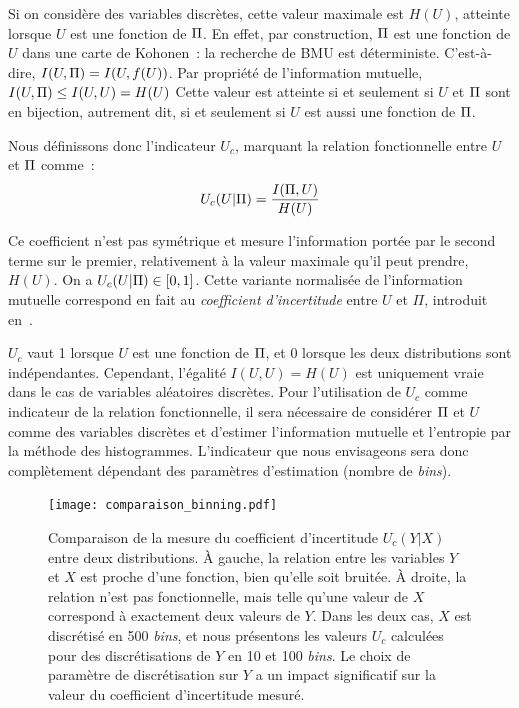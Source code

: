 \documentclass[../main]{subfiles}
\begin{document}
Si on considère des variables discrètes, cette valeur maximale est $H(U)$, atteinte lorsque $U$ est une fonction de $\Pi$.
En effet, par construction, $\Pi$ est une fonction de $U$ dans une carte de Kohonen~: la recherche de BMU est déterministe. C'est-à-dire, $I(U,\Pi) = I (U, f(U))$.
Par propriété de l'information mutuelle, $I(U,\Pi) \leq I(U,U) = H(U)$
Cette valeur est atteinte si et seulement si $U$ et $\Pi$ sont en bijection, autrement dit, si et seulement si $U$ est aussi une fonction de $\Pi$.

Nous définissons donc l'indicateur $U_c$, marquant la relation fonctionnelle entre $U$ et $\Pi$ comme~:
\begin{equation}
U_c(U|\Pi) = \frac{I(\Pi,U)}{H(U)}
\end{equation}

Ce coefficient n'est pas symétrique et mesure l'information portée par le second terme sur le premier, relativement à la valeur maximale qu'il peut prendre, $H(U)$. 
On a $U_c(U|\Pi) \in [0,1]$. 
Cette variante normalisée de l'information mutuelle correspond en fait au \emph{coefficient d'incertitude} entre $U$ et $\Pi$, introduit en~\cite{Theil1961EconomicFA}.

$U_c$ vaut 1 lorsque $U$ est une fonction de $\Pi$, et $0$ lorsque les deux distributions sont indépendantes.
Cependant, l'égalité $I(U,U) = H(U)$ est uniquement vraie dans le cas de variables aléatoires discrètes.
Pour l'utilisation de $U_c$ comme indicateur de la relation fonctionnelle, il sera nécessaire de considérer $\Pi$ et $U$ comme des variables discrètes et d'estimer l'information mutuelle et l'entropie par la méthode des histogrammes. L'indicateur que nous envisageons sera donc complètement dépendant des paramètres d'estimation (nombre de \emph{bins}).

\begin{figure}
    \centering
    \texttt{[image: comparaison\_binning.pdf]}
    \caption{Comparaison de la mesure du coefficient d'incertitude $U_c(Y|X)$ entre deux distributions. À gauche, la relation entre les variables $Y$ et $X$ est proche d'une fonction, bien qu'elle soit bruitée. À droite, la relation n'est pas fonctionnelle, mais telle qu'une valeur de $X$ correspond à exactement deux valeurs de $Y$. Dans les deux cas, $X$ est discrétisé en 500 \emph{bins}, et nous présentons les valeurs $U_c$ calculées pour des discrétisations de $Y$ en 10 et 100 \emph{bins}. Le choix de paramètre de discrétisation sur $Y$ a un impact significatif sur la valeur du coefficient d'incertitude mesuré.}
    \label{fig:exemple-limite}
    \end{figure}
\end{document}
